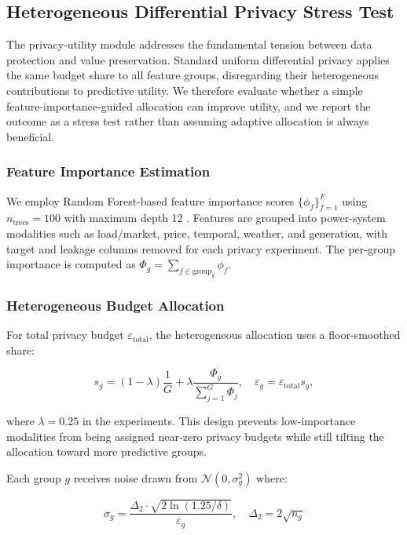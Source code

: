 \documentclass{ieeeaccess}
\begin{document}
\subsection{Heterogeneous Differential Privacy Stress Test}
\label{sec:privacy}

The privacy-utility module addresses the fundamental tension between data protection and value preservation. Standard uniform differential privacy applies the same budget share to all feature groups, disregarding their heterogeneous contributions to predictive utility. We therefore evaluate whether a simple feature-importance-guided allocation can improve utility, and we report the outcome as a stress test rather than assuming adaptive allocation is always beneficial.

\subsubsection{Feature Importance Estimation}

We employ Random Forest-based feature importance scores $\{\phi_f\}_{f=1}^F$ using $n_{\text{trees}} = 100$ with maximum depth 12 \cite{b27}. Features are grouped into power-system modalities such as load/market, price, temporal, weather, and generation, with target and leakage columns removed for each privacy experiment. The per-group importance is computed as $\Phi_g = \sum_{f \in \text{group}_g} \phi_f$.

\subsubsection{Heterogeneous Budget Allocation}

For total privacy budget $\varepsilon_{\text{total}}$, the heterogeneous allocation uses a floor-smoothed share:

\begin{equation}
s_g = (1-\lambda)\frac{1}{G} + \lambda \frac{\Phi_g}{\sum_{j=1}^G \Phi_j}, \quad
\varepsilon_g = \varepsilon_{\text{total}} s_g,
\label{eq:eps_alloc}
\end{equation}

where $\lambda=0.25$ in the experiments. This design prevents low-importance modalities from being assigned near-zero privacy budgets while still tilting the allocation toward more predictive groups.

Each group $g$ receives noise drawn from $\mathcal{N}(0, \sigma_g^2)$ where:

\begin{equation}
\sigma_g = \frac{\Delta_2 \cdot \sqrt{2 \ln(1.25/\delta)}}{\varepsilon_g}, \quad \Delta_2 = 2\sqrt{n_g}
\label{eq:sigma}
\end{equation}
\end{document}
